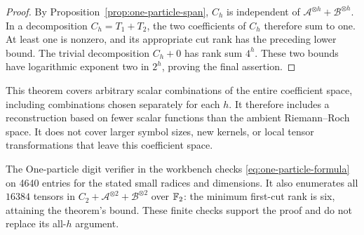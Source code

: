 \begin{proof}
By Proposition~\ref{prop:one-particle-span}, $C_h$ is independent
of $\mathcal A^{\otimes h}+\mathcal B^{\otimes h}$.
In a decomposition $C_h=T_1+T_2$, the two coefficients of $C_h$
therefore sum to one. At least one is nonzero, and its appropriate
cut rank has the preceding lower bound. The trivial decomposition
$C_h+0$ has rank sum $4^h$. These two bounds have logarithmic
exponent two in $2^h$, proving the final assertion.
\end{proof}

This theorem covers arbitrary scalar combinations of the entire
coefficient space, including combinations chosen separately for each
$h$. It therefore includes a reconstruction based on fewer scalar
functions than the ambient Riemann--Roch space. It does not cover
larger symbol sizes, new kernels, or local tensor transformations
that leave this coefficient space.

The One-particle digit verifier in the workbench checks
\eqref{eq:one-particle-formula} on 4640 entries for the stated small
radices and dimensions. It also enumerates all $16384$ tensors in
$C_2+\mathcal A^{\otimes2}+\mathcal B^{\otimes2}$ over $\mathbb F_2$:
the minimum first-cut rank is six, attaining the theorem's bound.
These finite checks support the proof and do not replace its
all-$h$ argument.
